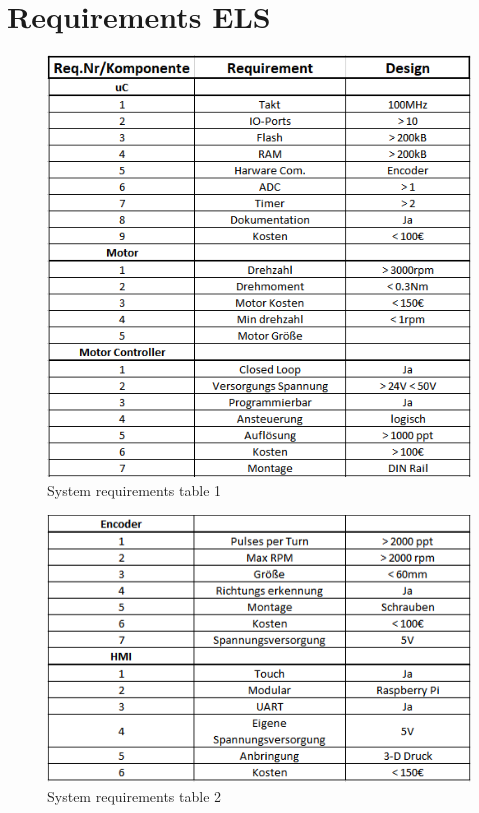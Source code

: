 \chapter{Requirements ELS}
\label{AppendixRequirements}
\begin{figure}[!h]
    \begin{center}
    \includegraphics[width=12cm]{Pictures/AppRequ1.png}
    \caption[System requirements table 1]{System requirements table 1}
    \end{center}
\end{figure}

\begin{figure}[t]
    \begin{center}
    \includegraphics[width=12cm]{Pictures/AppRequ2.png}
    \caption[System requirements table 2]{System requirements table 2}
    \end{center}
\end{figure}